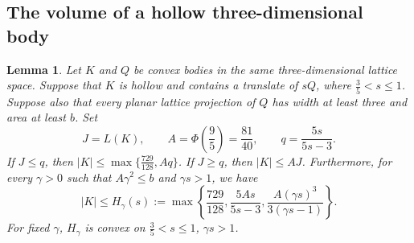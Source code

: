\documentclass[reqno, 11pt]{article}
\numberwithin{equation}{section}
\newtheorem{lemma}[lemma]{Lemma}
\theoremstyle{definition}
\begin{document}
\subsection{The volume of a hollow three-dimensional body}

\begin{lemma}\label{aux:hollow-envelope}
Let $K$ and $Q$ be convex bodies in the same three-dimensional lattice
space. Suppose that $K$ is hollow and contains a translate of $sQ$, where $\frac{3}{5}<s\le1$.
Suppose also that every planar lattice projection of $Q$ has width
at least three and area at least $b$. Set
\[
 J=L(K),\qquad A=\Phi(\frac{9}{5})=\frac{81}{40},\qquad q=\frac{5s}{5s-3}.
\]
If $J\le q$, then $|K|\le\max\{\frac{729}{128},Aq\}$. If $J\ge q$,
then $|K|\le AJ$. Furthermore, for every $\gamma>0$ such that
$A\gamma^2\le b$ and $\gamma s>1$, we have
\begin{equation}\label{aux:eq-hollow-envelope}
 |K|\le H_\gamma(s):=
 \max\left\{\frac{729}{128},\frac{5As}{5s-3},
                         \frac{A(\gamma s)^3}{3(\gamma s-1)}\right\}.
\end{equation}
For fixed $\gamma$, $H_\gamma$ is convex on $\frac{3}{5}<s\le1$, $\gamma s>1$.
\end{lemma}
\end{document}
